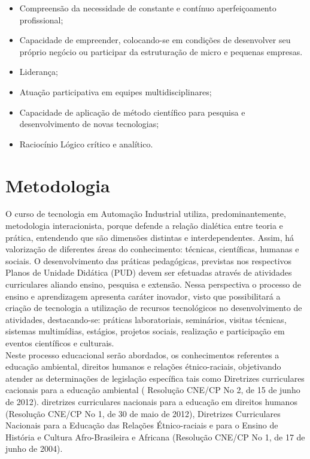 \begin{itemize}
\item Compreensão da necessidade de constante e contínuo aperfeiçoamento profissional;

\item Capacidade de empreender, colocando-se em condições de desenvolver seu próprio negócio ou participar da estruturação de micro e pequenas empresas.

\item Liderança;

\item Atuação participativa em equipes multidisciplinares;

\item Capacidade de aplicação de método científico para pesquisa e desenvolvimento de novas tecnologias;

\item Raciocínio Lógico crítico e analítico.

\end{itemize}

\chapter{Metodologia}

O curso de tecnologia em Automação Industrial utiliza, predominantemente, metodologia interacionista, porque defende a relação dialética entre teoria e prática, entendendo que são dimensões distintas e interdependentes. Assim, há valorização de diferentes áreas do conhecimento: técnicas, científicas, humanas e sociais. O desenvolvimento das práticas pedagógicas, previstas nos respectivos Planos de Unidade Didática (PUD) devem ser efetuadas através de atividades curriculares aliando ensino, pesquisa e extensão. Nessa perspectiva o processo de ensino e aprendizagem apresenta caráter inovador, visto que possibilitará a criação de tecnologia a utilização de recursos tecnológicos no desenvolvimento de  atividades, destacando-se: práticas laboratoriais, seminários, visitas técnicas, sistemas multimídias, estágios, projetos sociais, realização e participação em eventos científicos e culturais.\\

Neste processo educacional serão abordados, os conhecimentos referentes a educação ambiental, direitos humanos e relações étnico-raciais, objetivando atender as determinações de legislação específica tais como Diretrizes curriculares cacionais para a educação ambiental ( Resolução CNE/CP No 2, de 15 de junho de 2012). diretrizes curriculares nacionais para a educação em direitos humanos (Resolução CNE/CP No 1, de 30 de maio de 2012), Diretrizes Curriculares Nacionais para a Educação das Relações Étnico-raciais e para o Ensino de História e Cultura Afro-Brasileira e Africana (Resolução CNE/CP No 1, de 17 de junho de 2004).\\

